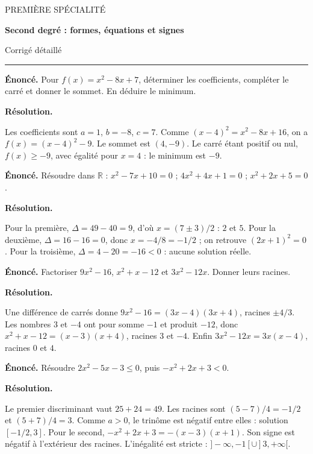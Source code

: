 \documentclass[11pt,a4paper]{article}
\begin{document}
{\small\color{Blue}PREMIÈRE SPÉCIALITÉ}\par{\LARGE\bfseries Second degré : formes, équations et signes}\par{\large Corrigé détaillé}\par\vspace{0.2cm}\hrule\vspace{0.4cm}
\par\noindent\begin{minipage}{\linewidth}
{\small\color{Muted}\textbf{Énoncé.} Pour $f(x)=x^2-8x+7$, déterminer les coefficients, compléter le carré et donner le sommet. En déduire le minimum.}
\par\medskip
\textbf{Résolution.}\par
Les coefficients sont $a=1$, $b=-8$, $c=7$. Comme $(x-4)^2=x^2-8x+16$, on a $f(x)=(x-4)^2-9$. Le sommet est $(4,-9)$. Le carré étant positif ou nul, $f(x)\ge-9$, avec égalité pour $x=4$ : le minimum est $-9$.
\end{minipage}\par
\par\noindent\begin{minipage}{\linewidth}
{\small\color{Muted}\textbf{Énoncé.} Résoudre dans $\mathbb R$ : $x^2-7x+10=0$ ; $4x^2+4x+1=0$ ; $x^2+2x+5=0$.}
\par\medskip
\textbf{Résolution.}\par
Pour la première, $\Delta=49-40=9$, d’où $x=(7\pm3)/2$ : $2$ et $5$. Pour la deuxième, $\Delta=16-16=0$, donc $x=-4/8=-1/2$ ; on retrouve $(2x+1)^2=0$. Pour la troisième, $\Delta=4-20=-16<0$ : aucune solution réelle.
\end{minipage}\par
\par\noindent\begin{minipage}{\linewidth}
{\small\color{Muted}\textbf{Énoncé.} Factoriser $9x^2-16$, $x^2+x-12$ et $3x^2-12x$. Donner leurs racines.}
\par\medskip
\textbf{Résolution.}\par
Une différence de carrés donne $9x^2-16=(3x-4)(3x+4)$, racines $\pm4/3$. Les nombres $3$ et $-4$ ont pour somme $-1$ et produit $-12$, donc $x^2+x-12=(x-3)(x+4)$, racines $3$ et $-4$. Enfin $3x^2-12x=3x(x-4)$, racines $0$ et $4$.
\end{minipage}\par
\par\noindent\begin{minipage}{\linewidth}
{\small\color{Muted}\textbf{Énoncé.} Résoudre $2x^2-5x-3\le0$, puis $-x^2+2x+3<0$.}
\par\medskip
\textbf{Résolution.}\par
Le premier discriminant vaut $25+24=49$. Les racines sont $(5-7)/4=-1/2$ et $(5+7)/4=3$. Comme $a>0$, le trinôme est négatif entre elles : solution $[-1/2,3]$. Pour le second, $-x^2+2x+3=-(x-3)(x+1)$. Son signe est négatif à l’extérieur des racines. L’inégalité est stricte : $]-\infty,-1[\cup]3,+\infty[$.
\end{minipage}\par
\end{document}
